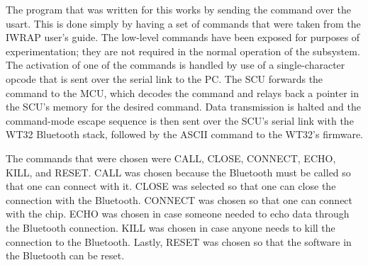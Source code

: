 The program that was written for this works by sending the command over the
 usart.  This is done simply by having a set of commands that were taken from 
the IWRAP user's guide. The low-level commands have been exposed for purposes
of experimentation; they are not required in the normal operation of the 
subsystem. The activation of one of the commands is handled by use of a
single-character opcode that is sent over the serial link to the PC. The SCU
forwards the command to the MCU, which decodes the command and relays back a
pointer in the SCU's memory for the desired command. Data transmission is 
halted and the command-mode escape sequence is then sent over the SCU's serial
link with the WT32 Bluetooth stack, followed by the ASCII command to the WT32's firmware. 
 
  The commands that were chosen were CALL, CLOSE, CONNECT, ECHO, KILL, and
 RESET.  CALL was chosen because the Bluetooth must be called so that one can
 connect with it.  CLOSE was selected so that one can close the connection 
with the Bluetooth.  CONNECT was chosen so that one can connect with the chip.
  ECHO was chosen in case someone needed to echo data through the Bluetooth
 connection.  KILL was chosen in case anyone needs to kill the connection to
 the Bluetooth.  Lastly, RESET was chosen so that the software in the Bluetooth
 can be reset. 
